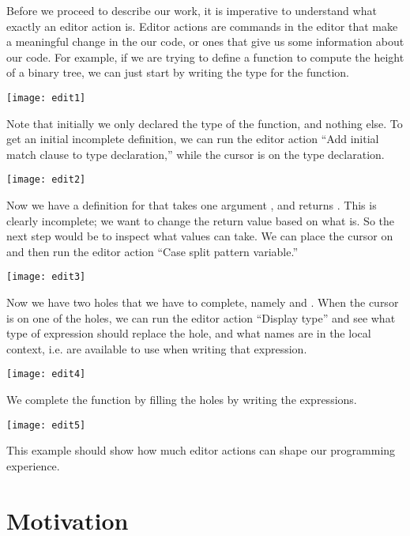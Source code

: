 Before we proceed to describe our work,
it is imperative to understand what exactly an editor action is.
Editor actions are commands in the editor that make a meaningful
change in the our code, or ones that give us some information about our
code. For example, if we are trying to define a function to compute the height
of a binary tree, we can just start by writing the type for the function.

\vspace{1em}
\texttt{[image: edit1]}

Note that initially we only declared the type of the function, and nothing
else. To get an initial incomplete definition, we can run the editor action
``Add initial match clause to type declaration,'' while the cursor is on the
type declaration.

\vspace{1em}
\texttt{[image: edit2]}

Now we have a definition for  that takes one argument , and
returns . This is clearly incomplete; we want to change
the return value based on what  is. So the next step would be to inspect
what values  can take. We can place the cursor on  and then run
the editor action ``Case split pattern variable.''

\vspace{1em}
\texttt{[image: edit3]}

Now we have two holes that we have to complete, namely  and
. When the cursor is on one of the holes, we can run the
editor action ``Display type'' and see what type of expression should replace
the hole, and what names are in the local context, i.e. are available to use
when writing that expression.

\vspace{1em}
\texttt{[image: edit4]}

We complete the function by filling the holes by writing the expressions.

\vspace{1em}
\texttt{[image: edit5]}

This example should show how much editor actions can shape our
programming experience.

\section{Motivation}


